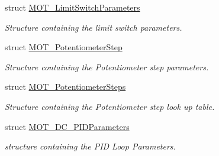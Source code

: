\begin{DoxyCompactItemize}
struct \hyperlink{struct_m_o_t___limit_switch_parameters}{M\+O\+T\+\_\+\+Limit\+Switch\+Parameters}
\begin{DoxyCompactList}\small\item\em Structure containing the limit switch parameters. \end{DoxyCompactList}\item 
struct \hyperlink{struct_m_o_t___potentiometer_step}{M\+O\+T\+\_\+\+Potentiometer\+Step}
\begin{DoxyCompactList}\small\item\em Structure containing the Potentiometer step parameters. \end{DoxyCompactList}\item 
struct \hyperlink{struct_m_o_t___potentiometer_steps}{M\+O\+T\+\_\+\+Potentiometer\+Steps}
\begin{DoxyCompactList}\small\item\em Structure containing the Potentiometer step look up table. \end{DoxyCompactList}\item 
struct \hyperlink{struct_m_o_t___d_c___p_i_d_parameters}{M\+O\+T\+\_\+\+D\+C\+\_\+\+P\+I\+D\+Parameters}
\begin{DoxyCompactList}\small\item\em structure containing the P\+ID Loop Parameters. \end{DoxyCompactList}\end{DoxyCompactItemize}

